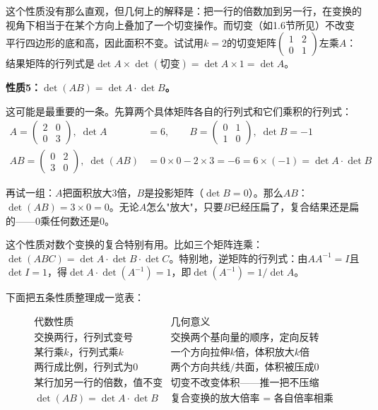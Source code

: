 这个性质没有那么直观，但几何上的解释是：把一行的倍数加到另一行，在变换的视角下相当于在某个方向上叠加了一个切变操作。而切变（如1.6节所见）不改变平行四边形的底和高，因此面积不变。试试用$k=2$的切变矩阵$\begin{pmatrix}1&2\\0&1\end{pmatrix}$左乘$A$：结果矩阵的行列式是$\det A\times\det(\text{切变})=\det A\times1=\det A$。

\vspace{0.2cm}
\noindent\textbf{性质5：$\det(AB)=\det A\cdot\det B$。}

这可能是最重要的一条。先算两个具体矩阵各自的行列式和它们乘积的行列式：
\begin{align*}
A=\begin{pmatrix}2&0\\0&3\end{pmatrix},\;\det A&=6,\qquad
B=\begin{pmatrix}0&1\\1&0\end{pmatrix},\;\det B=-1\\[2pt]
AB=\begin{pmatrix}0&2\\3&0\end{pmatrix},\;\det(AB)&=0\times0-2\times3=-6=6\times(-1)=\det A\cdot\det B
\end{align*}

再试一组：$A$把面积放大$3$倍，$B$是投影矩阵（$\det B=0$）。那么$AB$：$\det(AB)=3\times0=0$。无论$A$怎么"放大"，只要$B$已经压扁了，复合结果还是扁的——$0$乘任何数还是$0$。

这个性质对数个变换的复合特别有用。比如三个矩阵连乘：$\det(ABC)=\det A\cdot\det B\cdot\det C$。特别地，逆矩阵的行列式：由$AA^{-1}=I$且$\det I=1$，得$\det A\cdot\det(A^{-1})=1$，即$\det(A^{-1})=1/\det A$。

下面把五条性质整理成一览表：

\[
\begin{array}{c|c}
\textbf{代数性质} & \textbf{几何意义}\\\hline
\text{交换两行，行列式变号} & \text{交换两个基向量的顺序，定向反转}\\
\text{某行乘$k$，行列式乘$k$} & \text{一个方向拉伸$k$倍，体积放大$k$倍}\\
\text{两行成比例，行列式为$0$} & \text{两个方向共线/共面，体积被压成$0$}\\
\text{某行加另一行的倍数，值不变} & \text{切变不改变体积——推一把不压缩}\\
\det(AB)=\det A\cdot\det B & \text{复合变换的放大倍率 $=$ 各自倍率相乘}
\end{array}
\]

